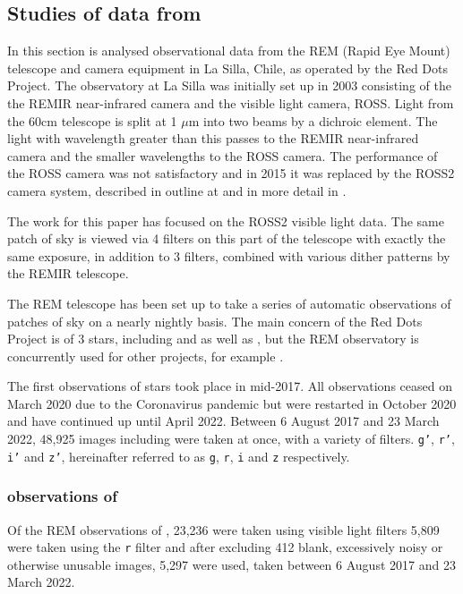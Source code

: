 \subsection{Studies of data from {\rem}}
\protect\label{section:rem}

In this section is analysed observational data from the
REM (Rapid Eye Mount) telescope and camera equipment in La Silla, Chile, as
operated by the Red Dots Project. The observatory at La Silla was initially set up in 2003
\citep{antonelli05} consisting of the the REMIR near-infrared camera and the
visible light camera, ROSS. Light from the 60cm telescope is split at 1 $\mu$m into two beams
by a dichroic element. The light with wavelength greater than this passes to the
REMIR near-infrared camera and the smaller wavelengths to the ROSS camera.
The performance of the ROSS camera was not satisfactory and in 2015 it
was replaced by the ROSS2 camera system, described in outline at
\citet{reminaf7} and in more detail in \citet{molinari14}.

The work for this paper has focused on the ROSS2 visible light data. The same
patch of sky is viewed via 4 filters on this part of the telescope with exactly
the same exposure, in addition to 3 filters, combined with various dither
patterns by the REMIR telescope.

The REM telescope has been set up to take a series of automatic
observations of patches of sky on a nearly nightly basis. The main concern of
the Red Dots Project is of 3 {\rdwarf} stars, including {\prox} and {\bstar} as
well as \ross, but the REM observatory is concurrently used for other projects,
for example \citet{giannini18}.

The first observations of {\rdwarf} stars took place in mid-2017. All
observations ceased on March 2020 due to the Coronavirus pandemic but were
restarted in October 2020 and have continued up until April 2022. Between 6
August 2017 and 23 March 2022, 48,925 images including {\ross} were taken at
once, with a variety of filters. \texttt{g'}, \texttt{r'}, \texttt{i'} and
\texttt{z'}, hereinafter referred to as \texttt{g}, \texttt{r}, \texttt{i} and
\texttt{z} respectively.

\subsubsection{{\rem} observations of \ross}
\protect\label{section:remross}

Of the REM observations of \ross, 23,236 were taken using visible light filters
5,809 were taken using the \texttt{r} filter and after excluding 412 blank,
excessively noisy or otherwise unusable images, 5,297 were used, taken between 6
August 2017 and 23 March 2022.

